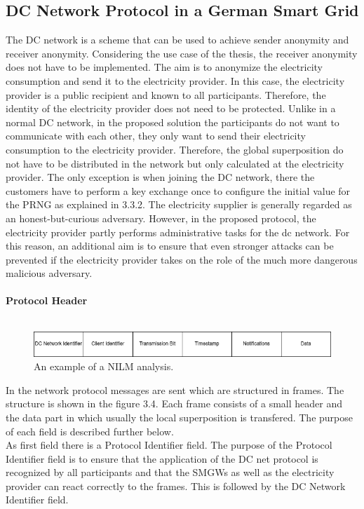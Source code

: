 \subsection{DC Network Protocol in a German Smart Grid}
The DC network is a scheme that can be used to achieve sender anonymity and receiver anonymity. Considering the use case of the thesis, the receiver anonymity does not have to be implemented. The aim is to anonymize the electricity consumption and send it to the electricity provider. In this case, the electricity provider is a public recipient and known to all participants. Therefore, the identity of the electricity provider does not need to be protected. Unlike in a normal DC network, in the proposed solution the participants do not want to communicate with each other, they only want to send their electricity consumption to the electricity provider. Therefore, the global superposition do not have to be distributed in the network but only calculated at the electricity provider. The only exception is when joining the DC network, there the customers have to perform a key exchange once to configure the initial value for the PRNG as explained in 3.3.2. The electricity supplier is generally regarded as an honest-but-curious adversary. However, in the proposed protocol, the electricity provider partly performs administrative tasks for the dc network. For this reason, an additional aim is to ensure that even stronger attacks can be prevented if the electricity provider takes on the role of the much more dangerous malicious adversary. \\
\\
\textbf{Protocol Header}
\\
\\\begin{figure}[tbp]
  \centering
  \includegraphics[width=1\textwidth]{images/Header.png}
  \caption[Short description]{An example of a NILM analysis.}
  \label{fig:Appliance_Model}
\end{figure}In the network protocol messages are sent which are structured in frames. The structure is shown in the figure 3.4. Each frame consists of a small header and the data part in which usually the local superposition is transfered. The purpose of each field is described further below.\\
As first field there is a Protocol Identifier field. The purpose of the Protocol Identifier field is to ensure that the application of the DC net protocol is recognized by all participants and that the SMGWs as well as the electricity provider can react correctly to the frames. This is followed by the DC Network Identifier field.%

